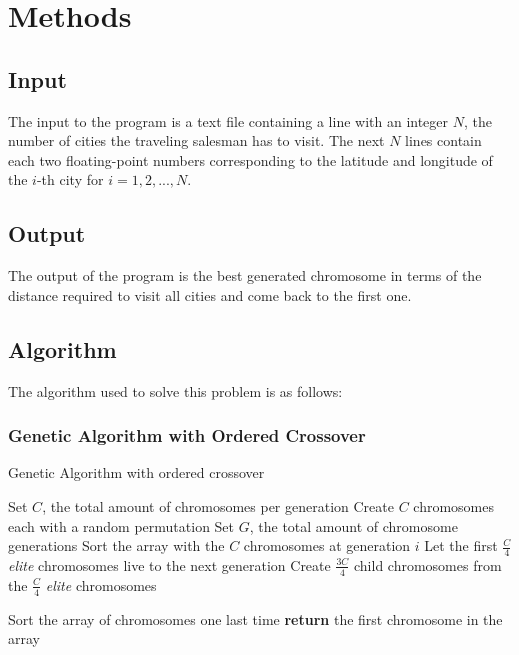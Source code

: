 \documentclass[twoside,twocolumn]{article}
\begin{document}
  
  \section{Methods}
  
  \subsection{Input}
  The input to the program is a text file containing a line with an integer $N$, the number of cities the traveling salesman has to visit. The next $N$ lines contain each two floating-point numbers corresponding to the latitude and longitude of the $i$-th city for $i = 1,2,...,N$.
  
  \subsection{Output}
  The output of the program is the best generated chromosome in terms of the distance required to visit all cities and come back to the first one.
  
  \subsection{Algorithm} 
  The algorithm used to solve this problem is as follows:
  
  \subsubsection{Genetic Algorithm with Ordered Crossover}
  
  \begin{algorithm}
          \caption{Genetic Algorithm with ordered crossover}\label{ga}
          {\fontsize{6}{6}\selectfont \begin{algorithmic}[1]
              \State Set $C$, the total amount of chromosomes per generation
              \State Create $C$ chromosomes each with a random permutation
              \State Set $G$, the total amount of chromosome generations 
                \State Sort the array with the $C$ chromosomes at generation $i$
                  \State Let the first $\frac{C}{4}$ \textit{elite} chromosomes live to the next generation
                  \State Create $\frac{3C}{4}$ child chromosomes from the $\frac{C}{4}$ \textit{elite} chromosomes
            
              \EndFor
              \State Sort the array of chromosomes one last time
              \State\textbf{return} the first chromosome in the array
              \EndProcedure
          \end{algorithmic}}
      \end{algorithm}
  
\end{document}
